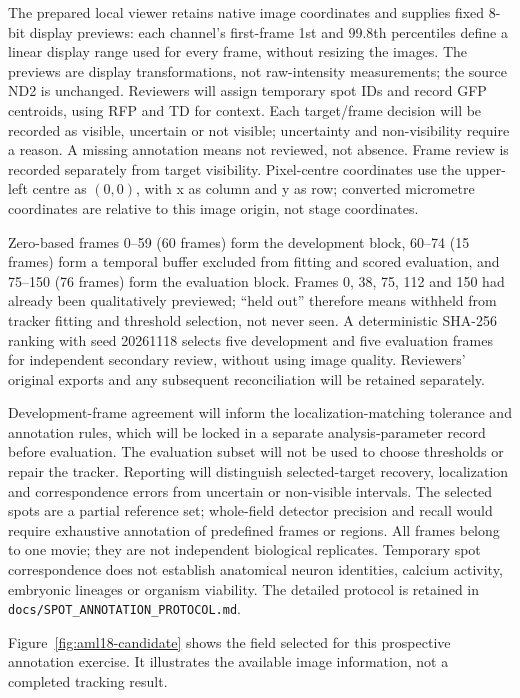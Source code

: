 \documentclass[11pt]{article}
\begin{document}
The prepared local viewer retains native image coordinates and supplies fixed
8-bit display previews: each channel's first-frame 1st and 99.8th percentiles
define a linear display range used for every frame, without resizing the images.
The previews are display transformations, not raw-intensity measurements; the
source ND2 is unchanged. Reviewers will assign temporary spot IDs and record
GFP centroids, using RFP and TD for context. Each target/frame decision will be
recorded as visible, uncertain or not visible; uncertainty and non-visibility
require a reason. A missing annotation means not reviewed, not absence. Frame
review is recorded separately from target visibility. Pixel-centre coordinates
use the upper-left centre as $(0,0)$, with x as column and y as row; converted
micrometre coordinates are relative to this image origin, not stage coordinates.

Zero-based frames 0--59 (60 frames) form the development block, 60--74 (15 frames)
form a temporal buffer excluded from fitting and scored evaluation, and 75--150
(76 frames) form the evaluation block. Frames 0, 38, 75, 112 and 150 had already
been qualitatively previewed; ``held out'' therefore means withheld from tracker
fitting and threshold selection, not never seen. A deterministic SHA-256 ranking
with seed 20261118 selects five development and five evaluation frames for
independent secondary review, without using image quality. Reviewers' original
exports and any subsequent reconciliation will be retained separately.

Development-frame agreement will inform the localization-matching tolerance and
annotation rules, which will be locked in a separate analysis-parameter record
before evaluation. The evaluation subset will not be used to choose thresholds
or repair the tracker. Reporting will distinguish selected-target recovery,
localization and correspondence errors from uncertain or non-visible intervals.
The selected spots are a partial reference set; whole-field detector precision
and recall would require exhaustive annotation of predefined frames or regions.
All frames belong to one movie;
they are not independent biological replicates. Temporary spot correspondence
does not establish anatomical neuron identities, calcium activity, embryonic
lineages or organism viability. The detailed protocol is retained in
\nolinkurl{docs/SPOT_ANNOTATION_PROTOCOL.md}.

Figure~\ref{fig:aml18-candidate} shows the field selected for this prospective
annotation exercise. It illustrates the available image information, not a
completed tracking result.
\end{document}
